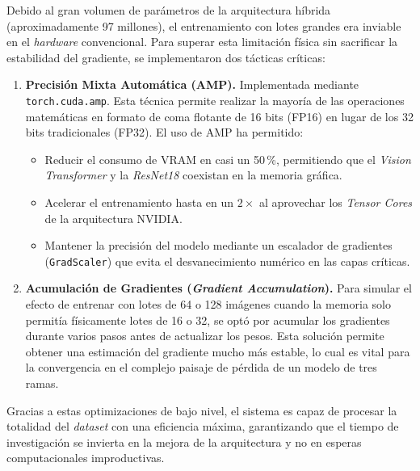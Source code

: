 Debido al gran volumen de parámetros de la arquitectura híbrida (aproximadamente 97 millones), el entrenamiento con lotes grandes era inviable en el \textit{hardware} convencional. Para superar esta limitación física sin sacrificar la estabilidad del gradiente, se implementaron dos tácticas críticas:

\begin{enumerate}
	\item \textbf{Precisión Mixta Automática (AMP).} Implementada mediante \texttt{torch.cuda.amp}. Esta técnica permite realizar la mayoría de las operaciones matemáticas en formato de coma flotante de 16 bits (FP16) en lugar de los 32 bits tradicionales (FP32). El uso de AMP ha permitido:
	\begin{itemize}
		\item Reducir el consumo de VRAM en casi un 50\,\%, permitiendo que el \textit{Vision Transformer} y la \textit{ResNet18} coexistan en la memoria gráfica.
		\item Acelerar el entrenamiento hasta en un $2\times$ al aprovechar los \textit{Tensor Cores} de la arquitectura NVIDIA.
		\item Mantener la precisión del modelo mediante un escalador de gradientes (\texttt{GradScaler}) que evita el desvanecimiento numérico en las capas críticas.
	\end{itemize}
	
	\item \textbf{Acumulación de Gradientes (\textit{Gradient Accumulation}).} Para simular el efecto de entrenar con lotes de 64 o 128 imágenes cuando la memoria solo permitía físicamente lotes de 16 o 32, se optó por acumular los gradientes durante varios pasos antes de actualizar los pesos. Esta solución permite obtener una estimación del gradiente mucho más estable, lo cual es vital para la convergencia en el complejo paisaje de pérdida de un modelo de tres ramas.
\end{enumerate}

Gracias a estas optimizaciones de bajo nivel, el sistema es capaz de procesar la totalidad del \textit{dataset} con una eficiencia máxima, garantizando que el tiempo de investigación se invierta en la mejora de la arquitectura y no en esperas computacionales improductivas.